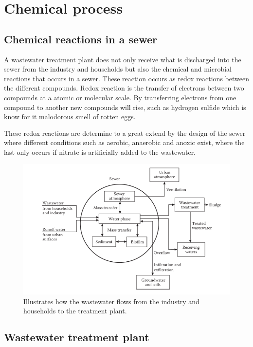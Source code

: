 \section{Chemical process}\label{se:chemical_process}


\subsection{Chemical reactions in a sewer}\label{subse:chemical_reactions_in_a_sewer}
A wastewater treatment plant does not only receive what is discharged into the sewer from the industry and households but also the chemical and microbial reactions that occurs in a sewer. These reaction occurs as redox reactions between the different compounds. Redox reaction is the transfer of electrons between two compounds at a atomic or molecular scale. By transferring electrons from one compound to another new compounds will rise, such as hydrogen sulfide which is know for it malodorous smell of rotten eggs. 


These redox reactions are determine to a great extend by the design of the sewer where different conditions such as aerobic, anaerobic and anoxic exist, where the last only occurs if nitrate is artificially added to the wastewater.





\begin{figure}[H]
\centering
\includegraphics[width=1\textwidth]{report/introduction/pictures/sewer_overview_of_the_different_parts.png}
\caption{Illustrates how the wastewater flows from the industry and households to the treatment plant. }
\label{fig:sewer_overview_of_the_different_parts}
\end{figure}


\subsection{Wastewater treatment plant}\label{subse:Wastewater treatment plant}

